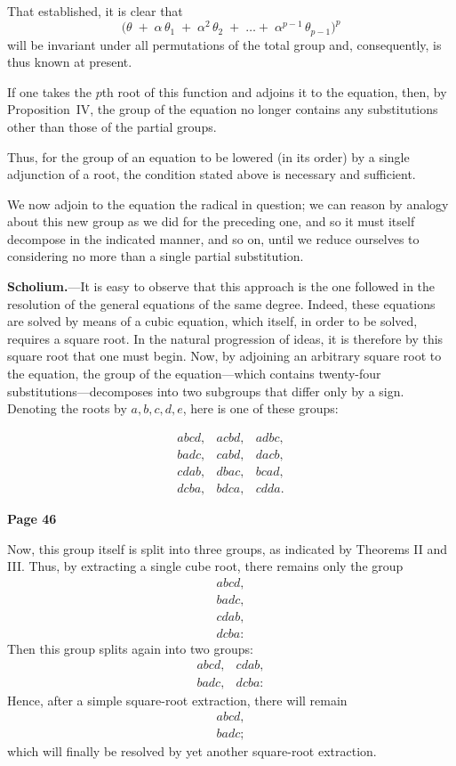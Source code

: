 \documentclass{article}
\begin{document}
\noindent
That established, it is clear that
\[
\bigl(\theta \;+\; \alpha\,\theta_{1}\;+\;\alpha^{2}\,\theta_{2}\;+\;\dots+\;\alpha^{p-1}\,\theta_{p-1}\bigr)^{p}
\]
will be invariant under all permutations of the total group and, consequently, is thus known at present.

\noindent
If one takes the $p$th root of this function and adjoins it to the equation, then, by Proposition~IV, the group of the equation no longer contains any substitutions other than those of the partial groups.

\noindent
Thus, for the group of an equation to be lowered (in its order) by a single adjunction of a root, the condition stated above is necessary and sufficient.

\noindent
We now adjoin to the equation the radical in question; we can reason by analogy about this new group as we did for the preceding one, and so it must itself decompose in the indicated manner, and so on, until we reduce ourselves to considering no more than a single partial substitution.

\medskip
\noindent
\textbf{Scholium.}---It is easy to observe that this approach is the one followed in the resolution of the general equations of the same degree. Indeed, these equations are solved by means of a cubic equation, which itself, in order to be solved, requires a square root. In the natural progression of ideas, it is therefore by this square root that one must begin. Now, by adjoining an arbitrary square root to the equation, the group of the equation---which contains twenty-four substitutions---decomposes into two subgroups that differ only by a sign. Denoting the roots by $a, b, c, d, e$, here is one of these groups:

\[
\begin{matrix}
abcd, & acbd, & adbc,\\ 
badc, & cabd, & dacb,\\ 
cdab, & dbac, & bcad,\\ 
dcba, & bdca, & cdda.
\end{matrix}
\]

\bigskip\bigskip




\centerline{\textbf{Page 46}}

Now, this group itself is split into three groups, as indicated by Theorems II and III. Thus, by extracting a single cube root, there remains only the group
\[
\begin{matrix}
abcd,\\ badc,\\ cdab,\\
dcba:
\end{matrix}
\]
Then this group splits again into two groups:
\[
\begin{matrix}
abcd, & cdab,\\ badc, & dcba:
\end{matrix}
\]
Hence, after a simple square-root extraction, there will remain
\[
\begin{matrix}
abcd,\\ badc;
\end{matrix}
\]
which will finally be resolved by yet another square-root extraction.
\end{document}
